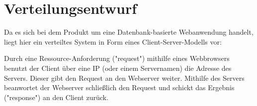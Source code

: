 \chapter{Verteilungsentwurf}
Da es sich bei dem Produkt um eine Datenbank-basierte Webanwendung handelt, liegt hier ein verteiltes System in Form eines Client-Server-Modells vor:

Durch eine Ressource-Anforderung ("request") mithilfe eines Webbrowsers benutzt der Client über eine IP (oder einem Servernamen) die Adresse des Servers. Dieser gibt den Request an den Webserver weiter.
Mithilfe des Servers beanwortet der Webserver schließlich den Request und schickt das Ergebnis ("response") an den Client zurück.   

